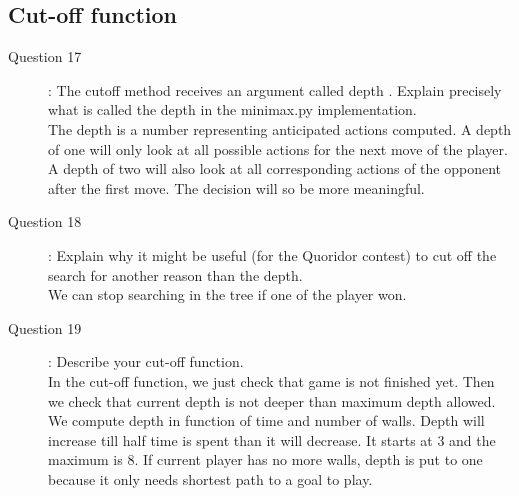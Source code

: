 \subsection{Cut-off function}
\begin{description}
\item[Question 17]: The cutoff method receives an argument called depth . Explain precisely what is called the depth in the minimax.py implementation.\\
The depth is a number representing anticipated actions computed. A depth of one will only look at all possible actions for the next move of the player. A depth of two will also look at all corresponding actions of the opponent after the first move. The decision will so be more meaningful. 
\item[Question 18]: Explain why it might be useful (for the Quoridor contest) to cut off the search for another reason than the depth.\\
We can stop searching in the tree if one of the player won.
\item[Question 19]: Describe your cut-off function.\\
In the cut-off function, we just check that game is not finished yet. Then we check that current depth is not deeper than maximum depth allowed. We compute depth in function of time and number of walls. Depth will increase till half time is spent than it will decrease. It starts at 3 and the maximum is 8. If current player has no more walls, depth is put to one because it only needs shortest path to a goal to play. 

\end{description}






